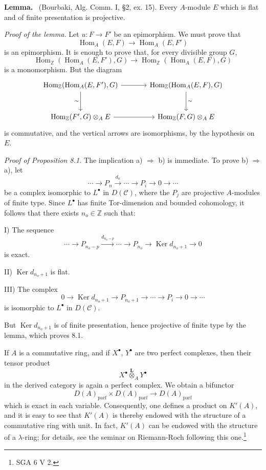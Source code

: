 \documentclass[11pt]{article}
\newenvironment{statement}[1]{\par\medskip\noindent\textbf{#1.}\ }{\par\medskip}
\DeclareMathOperator{\Hom}{Hom}
\providecommand{\Ker}{\operatorname{Ker}}
\providecommand{\parf}{\mathrm{parf}}
\providecommand{\Hom}{\operatorname{Hom}}
\providecommand{\cC}{\mathcal C}
\providecommand{\Ker}{\operatorname{Ker}}
\providecommand{\Ker}{\operatorname{Ker}}
\providecommand{\cC}{\mathcal C}
\providecommand{\parf}{\mathrm{parf}}
\begin{document}
\begin{statement}{Lemma}
(Bourbaki, Alg. Comm. I, §2, ex. 15). Every $A$-module $E$ which is flat and of finite presentation is projective.
\end{statement}

\emph{Proof of the lemma.} Let $u:F\to F'$ be an epimorphism. We must prove that
\[
\Hom_A(E,F)\longrightarrow\Hom_A(E,F')
\]
is an epimorphism. It is enough to prove that, for every divisible group $G$,
\[
\Hom_{\mathbb Z}(\Hom_A(E,F'),G)\longrightarrow
\Hom_{\mathbb Z}(\Hom_A(E,F),G)
\]
is a monomorphism. But the diagram
\[
\begin{tikzcd}[column sep=large,row sep=large]
\Hom_{\mathbb Z}(\Hom_A(E,F'),G)
 \arrow[r]\arrow[d,"\sim"']&
\Hom_{\mathbb Z}(\Hom_A(E,F),G)\arrow[d,"\sim"]\\
\Hom_{\mathbb Z}(F',G)\otimes_A E
 \arrow[r]&
\Hom_{\mathbb Z}(F,G)\otimes_A E
\end{tikzcd}
\]
is commutative, and the vertical arrows are isomorphisms, by the hypothesis on $E$.

\emph{Proof of Proposition 8.1.} The implication a) $\Rightarrow$ b) is immediate. To prove b) $\Rightarrow$ a), let
\[
\cdots\longrightarrow P_n\xrightarrow{d_n}\cdots\longrightarrow P_i\longrightarrow 0\longrightarrow\cdots
\]
be a complex isomorphic to $L^\bullet$ in $D(\cC)$, where the $P_j$ are projective $A$-modules of finite type. Since $L^\bullet$ has finite Tor-dimension and bounded cohomology, it follows that there exists $n_o\in\mathbb Z$ such that:

I) The sequence
\[
\cdots\longrightarrow P_{n_o-p}\xrightarrow{d_{n_o-p}}\cdots\longrightarrow
P_{n_o}\longrightarrow \Ker d_{n_o+1}\longrightarrow0
\]
is exact.

II) $\Ker d_{n_o+1}$ is flat.

III) The complex
\[
0\longrightarrow \Ker d_{n_o+1}\longrightarrow P_{n_o+1}\longrightarrow\cdots\longrightarrow P_i\longrightarrow0\longrightarrow\cdots
\]
is isomorphic to $L^\bullet$ in $D(\cC)$.

But $\Ker d_{n_o+1}$ is of finite presentation, hence projective of finite type by the lemma, which proves 8.1.

If $A$ is a commutative ring, and if $X^\bullet$, $Y^\bullet$ are two perfect complexes, then their tensor product
\[
X^\bullet\overset{\mathbf L}{\otimes}_A Y^\bullet
\]
in the derived category is again a perfect complex. We obtain a bifunctor
\[
D(A)_{\parf}\times D(A)_{\parf}\longrightarrow D(A)_{\parf}
\]
which is exact in each variable. Consequently, one defines a product on $K'(A)$, and it is easy to see that $K'(A)$ is thereby endowed with the structure of a commutative ring with unit. In fact, $K'(A)$ can be endowed with the structure of a $\lambda$-ring; for details, see the seminar on Riemann-Roch following this one.\footnote{SGA 6 V 2.}
\end{document}
